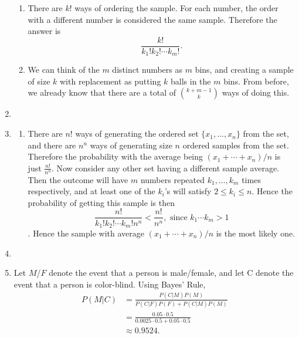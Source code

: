 \documentclass{article}
\begin{document}
\begin{enumerate}
\begin{enumerate}
        \item There are $k!$ ways of ordering the sample. For each number, the order with a
        different number is considered the same sample. Therefore the answer is
        \[ \frac{k!}{k_1!k_2!\cdots k_m!}. \]

        \item We can think of the $m$ distinct numbers as $m$ bins, and creating a sample of
        size $k$ with replacement as putting $k$ balls in the $m$ bins. From before, we
        already know that there are a total of $\binom{k + m - 1}{k}$ ways of doing this.
    \end{enumerate}

    \item

    \item \begin{enumerate}
        \item There are $n!$ ways of generating the ordered set $\{x_1, ..., x_n\}$
        from the set, and there are $n^n$ ways of generating size $n$ ordered samples from
        the set. Therefore the probability with the average being
        $(x_1 + \cdots + x_n) / n$ is just $\frac{n!}{n^n}$. Now consider any other set having
        a different sample average. Then the outcome will have $m$ numbers repeated
        $k_1, \dots, k_m$ times respectively, and at least one of the $k_i$'s will satisfy
        $2 \leq k_i \leq n$. Hence the probability of getting this sample is then
        \[ \frac{n!}{k_1!k_2!\cdots k_m! n^n} < \frac{n!}{n^n}, \text{ since }
        k_1 \cdots k_m > 1\].
        Hence the sample with average $(x_1 + \cdots + x_n) / n$ is the most likely one.
    \end{enumerate}

    \item

    \item Let $M$/$F$ denote the event that a person is male/female, and let C denote the event
    that a person is color-blind. Using Bayes' Rule,
    \begin{align*}
        P(M|C)
        &= \frac{P(C|M)P(M)}{P(C|F)P(F) + P(C|M)P(M)} \\
        &= \frac{0.05 \cdot 0.5}{0.0025 \cdot 0.5 + 0.05 \cdot 0.5} \\
        &\approx 0.9524.
    \end{align*}


\end{enumerate}
\end{document}
